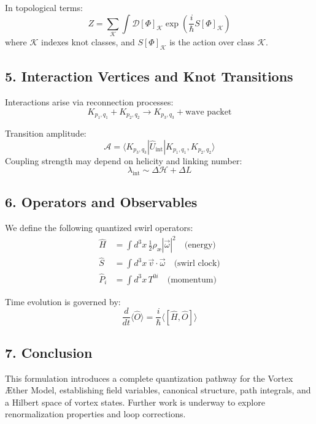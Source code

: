 \documentclass[12pt]{article}
\begin{document}
In topological terms:
\begin{equation}
Z = \sum_{\mathcal{K}} \int \mathcal{D}[\Phi]_{\mathcal{K}} \exp\left( \frac{i}{\hbar} S[\Phi]_{\mathcal{K}} \right)
\end{equation}
where \( \mathcal{K} \) indexes knot classes, and \( S[\Phi]_{\mathcal{K}} \) is the action over class \( \mathcal{K} \).

\subsection*{5. Interaction Vertices and Knot Transitions}

Interactions arise via reconnection processes:
\begin{equation}
K_{p_1,q_1} + K_{p_2,q_2} \rightarrow K_{p_3,q_3} + \text{wave packet}
\end{equation}

Transition amplitude:
\begin{equation}
\mathcal{A} = \langle K_{p_3,q_3} | \hat{U}_{\text{int}} | K_{p_1,q_1}, K_{p_2,q_2} \rangle
\end{equation}
Coupling strength may depend on helicity and linking number:
\begin{equation}
\lambda_{\text{int}} \sim \Delta \mathcal{H} + \Delta L
\end{equation}

\subsection*{6. Operators and Observables}

We define the following quantized swirl operators:
\begin{align}
\hat{H} &= \int d^3x\, \frac{1}{2} \rho_{\text{\ae}} |\vec{\omega}|^2 \quad \text{(energy)} \\
\hat{S} &= \int d^3x\, \vec{v} \cdot \vec{\omega} \quad \text{(swirl clock)} \\
\hat{P}_i &= \int d^3x\, T^{0i} \quad \text{(momentum)}
\end{align}

Time evolution is governed by:
\begin{equation}
\frac{d}{dt} \langle \hat{O} \rangle = \frac{i}{\hbar} \langle [\hat{H}, \hat{O}] \rangle
\end{equation}

\subsection*{7. Conclusion}

This formulation introduces a complete quantization pathway for the Vortex Æther Model, establishing field variables, canonical structure, path integrals, and a Hilbert space of vortex states. Further work is underway to explore renormalization properties and loop corrections.


\ifdefined\standalonechapter\else
    
    
    
\end{document}
